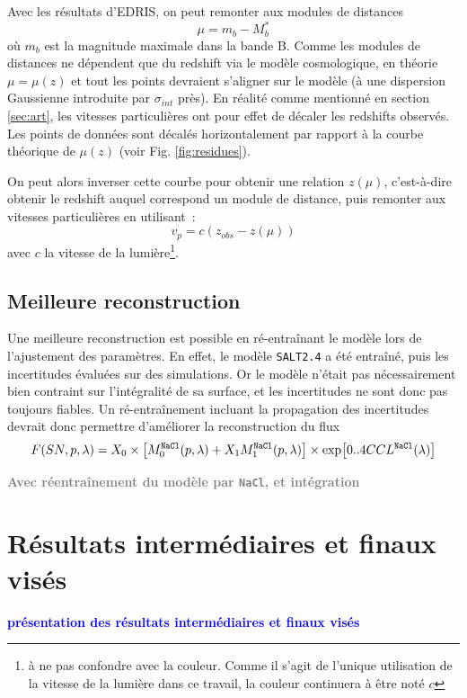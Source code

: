 \documentclass{book}
\newcommand{\todo}[1]{{\textcolor{gray}{\bf \large #1}}}
\newcommand{\consignes}[1]{{\textcolor{blue}{\bf \large #1}}}
\def\nacl{\texttt{NaCl}\xspace}
\def\saltd{\texttt{SALT2.4}\xspace}
\begin{document}
Avec les résultats d'EDRIS, on peut remonter aux modules de distances
\begin{equation}
    \mu = m_b - M_b^*
\end{equation}
où $m_b$ est la magnitude maximale dans la bande B.
Comme les modules de distances ne dépendent que du redshift via le modèle cosmologique, en théorie $\mu = \mu(z)$ et tout les points devraient s'aligner sur le modèle (à une dispersion Gaussienne introduite par $\sigma_{int}$ près). En réalité comme mentionné en section \ref{sec:art}, les vitesses particulières ont pour effet de décaler les redshifts observés. Les points de données sont décalés horizontalement par rapport à la courbe théorique de $\mu(z)$ (voir Fig. \ref{fig:residues}).

On peut alors inverser cette courbe pour obtenir une relation $z(\mu)$, c'est-à-dire obtenir le redshift auquel correspond un module de distance, puis remonter aux vitesses particulières en utilisant~:
\begin{equation}
    v_p = c (z_{obs} - z(\mu))
\end{equation}
avec $c$ la vitesse de la lumière\footnote{à ne pas confondre avec la couleur. Comme il s'agit de l'unique utilisation de la vitesse de la lumière dans ce travail, la couleur continuera à être noté $c$}.

\subsection{Meilleure reconstruction}

Une meilleure reconstruction est possible en ré-entraînant le modèle lors de l'ajustement des paramètres. En effet, le modèle \saltd a été entraîné, puis les incertitudes évaluées sur des simulations. Or le modèle n'était pas nécessairement bien contraint sur l'intégralité de sa surface, et les incertitudes ne sont donc pas toujours fiables. Un ré-entraînement incluant la propagation des incertitudes devrait donc permettre d'améliorer la reconstruction du flux
\begin{equation}
    F(SN, p, \lambda) = X_0 \times \qty[M^{\nacl}_0(p, \lambda) + X_1 M^{\nacl}_1(p, \lambda)] \times \exp[0..4 C CL^{\nacl}(\lambda)]
\end{equation}


\todo{Avec réentraînement du modèle par \nacl, et intégration}



\section{Résultats intermédiaires et finaux visés}
\consignes{présentation des résultats intermédiaires et finaux visés}
\end{document}
